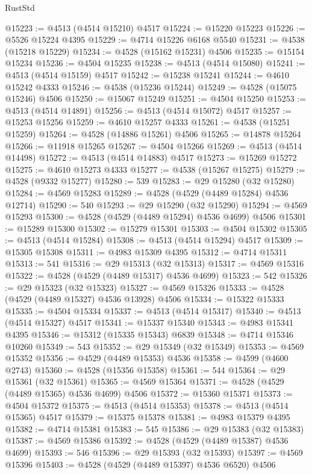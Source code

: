 \begin{lexlean}{RustStd}
\begin{coremodule}
@15223 := @4513 (@4514 @15210) @4517
@15224 := @15220 @15223
@15226 := @5526 @15224 @4395
@15229 := @4714 @15226 @6168 @5540
@15231 := @4538 (@15218 @15229)
@15234 := @4528 (@15162 @15231) @4506
@15235 := @15154 @15234
@15236 := @4504 @15235
@15238 := @4513 (@4514 @15080)
@15241 := @4513 (@4514 @15159) @4517
@15242 := @15238 @15241
@15244 := @4610 @15242 @4333
@15246 := @4538 (@15236 @15244)
@15249 := @4528 (@15075 @15246) @4506
@15250 := @15067 @15249
@15251 := @4504 @15250
@15253 := @4513 (@4514 @14891)
@15256 := @4513 (@4514 @15072) @4517
@15257 := @15253 @15256
@15259 := @4610 @15257 @4333
@15261 := @4538 (@15251 @15259)
@15264 := @4528 (@14886 @15261) @4506
@15265 := @14878 @15264
@15266 := @11918 @15265
@15267 := @4504 @15266
@15269 := @4513 (@4514 @14498)
@15272 := @4513 (@4514 @14883) @4517
@15273 := @15269 @15272
@15275 := @4610 @15273 @4333
@15277 := @4538 (@15267 @15275)
@15279 := @4528 (@9332 @15277)
@15280 := 539
@15283 := @29 @15280 (@32 @15280)
@15284 := @4569 @15283
@15289 := @4528 (@4529 (@4489 @15284) @4536 @12714)
@15290 := 540
@15293 := @29 @15290 (@32 @15290)
@15294 := @4569 @15293
@15300 := @4528 (@4529 (@4489 @15294) @4536 @4699) @4506
@15301 := @15289 @15300
@15302 := @15279 @15301
@15303 := @4504 @15302
@15305 := @4513 (@4514 @15284)
@15308 := @4513 (@4514 @15294) @4517
@15309 := @15305 @15308
@15311 := @4983 @15309 @4395
@15312 := @4714 @15311
@15313 := 541
@15316 := @29 @15313 (@32 @15313)
@15317 := @4569 @15316
@15322 := @4528 (@4529 (@4489 @15317) @4536 @4699)
@15323 := 542
@15326 := @29 @15323 (@32 @15323)
@15327 := @4569 @15326
@15333 := @4528 (@4529 (@4489 @15327) @4536 @13928) @4506
@15334 := @15322 @15333
@15335 := @4504 @15334
@15337 := @4513 (@4514 @15317)
@15340 := @4513 (@4514 @15327) @4517
@15341 := @15337 @15340
@15343 := @4983 @15341 @4395
@15346 := @15312 (@15335 @15343) @6839
@15348 := @4714 @15346 @10260
@15349 := 543
@15352 := @29 @15349 (@32 @15349)
@15353 := @4569 @15352
@15356 := @4529 (@4489 @15353) @4536
@15358 := @4599 (@4600 @2743)
@15360 := @4528 (@15356 @15358)
@15361 := 544
@15364 := @29 @15361 (@32 @15361)
@15365 := @4569 @15364
@15371 := @4528 (@4529 (@4489 @15365) @4536 @4699) @4506
@15372 := @15360 @15371
@15373 := @4504 @15372
@15375 := @4513 (@4514 @15353)
@15378 := @4513 (@4514 @15365) @4517
@15379 := @15375 @15378
@15381 := @4983 @15379 @4395
@15382 := @4714 @15381
@15383 := 545
@15386 := @29 @15383 (@32 @15383)
@15387 := @4569 @15386
@15392 := @4528 (@4529 (@4489 @15387) @4536 @4699)
@15393 := 546
@15396 := @29 @15393 (@32 @15393)
@15397 := @4569 @15396
@15403 := @4528 (@4529 (@4489 @15397) @4536 @6520) @4506

\end{coremodule}
\end{lexlean}
